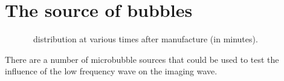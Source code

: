 \section{The source of bubbles}\label{sec:WE:why_water}

\begin{figure}[t]%
  \centering
    
  \caption{
    \Sonovue\ distribution at various times after manufacture (in minutes).
  }
  \label{fig:sonovue_sizes}
\end{figure}


There are a number of microbubble sources that could be used to test the influence of the low frequency wave 
on the imaging wave.



